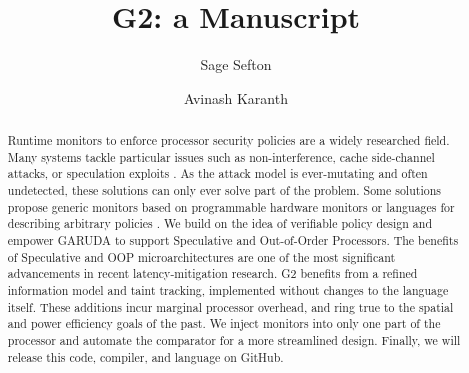\documentclass[sigconf,usenames,dvipsnames,svgnames,table]{acmart}
\def \sysname {\textsc{G2}\xspace}
\def \oldname {\textsc{GARUDA}\xspace}
\begin{document}

\title{\sysname: a Manuscript}


\author{Sage Sefton}

\author{Avinash Karanth}


\renewcommand{\shortauthors}{Sefton and Karanth}

\begin{abstract}

Runtime monitors to enforce processor security policies are a widely researched field.
Many systems tackle particular issues such as non-interference, cache side-channel attacks, or speculation exploits \cite{2017secverilogbl, 2019stt}.
As the attack model is ever-mutating and often undetected, these solutions can only ever solve part of the problem.
Some solutions propose generic monitors based on programmable hardware monitors \cite{2014pump} or languages for describing arbitrary policies \cite{2018garuda, 2014netkat}.
We build on the idea of verifiable policy design and empower \oldname to support Speculative and Out-of-Order Processors.
The benefits of Speculative and OOP microarchitectures are one of the most significant advancements in recent latency-mitigation research.
\sysname benefits from a refined information model and taint tracking, implemented without changes to the language itself.
These additions incur marginal processor overhead, and ring true to the spatial and power efficiency goals of the past.
We inject monitors into only one part of the processor and automate the comparator for a more streamlined design.
Finally, we will release this code, compiler, and language on GitHub.

\end{abstract}
\end{document}
